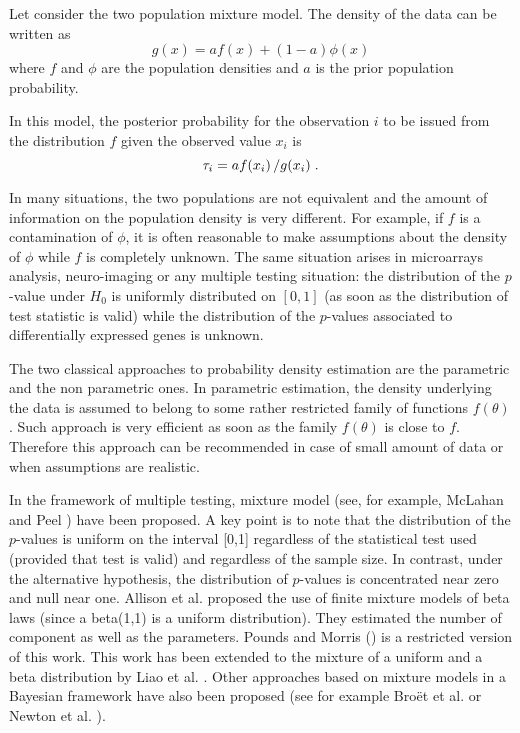 \documentclass[10pt]{article}
\begin{document}
Let consider the two population mixture model. The density of the data can be written as\[g(x)=af(x)+(1-a)\phi(x)\] where $f$ and $\phi$ are the population
densities and $a$ is the prior population probability.

In this model, the posterior probability for the observation $i$ to be issued from the distribution $f$ given the observed value $x_i$ is
\begin{equation} \label{Eq:Tau}
\tau_i = a f(x_i) \left/ g(x_i) \right..
\end{equation}

In many situations, the two populations are not equivalent and the amount of information on the population density is very different. For example, if $f$ is a
contamination of $\phi$, it is often reasonable to make assumptions about the density of $\phi$ while $f$ is completely unknown. The same situation arises in
microarrays analysis, neuro-imaging or any multiple testing situation: the distribution of the $p$-value under $H_0$ is uniformly distributed on $[0,1]$ (as
soon as the distribution of test statistic is valid) while the distribution of the $p$-values associated to differentially expressed genes is unknown.


The two classical approaches to probability density estimation are the parametric and the non parametric ones. In parametric estimation, the density underlying
the data is assumed to belong to some rather restricted family of functions $f(\theta)$. Such approach is very efficient as soon as the family $f(\theta)$ is
close to $f$. Therefore this approach can be recommended in case of small amount of data or when assumptions are realistic.

In the framework of multiple testing, mixture model (see, for example, McLahan and Peel \cite{MaP00} ) have been proposed.
A key point is to note that the distribution of the $p$-values is uniform on the interval [0,1] regardless of the statistical test used (provided that test is
valid) and regardless of the sample size. In contrast, under the alternative hypothesis, the distribution of $p$-values is concentrated near zero and null near
one. Allison et al. \cite{AGH02} proposed the use of finite mixture models of beta laws (since a beta(1,1) is a uniform distribution). They estimated the
number of component as well as the parameters. Pounds and Morris (\cite{POM03}) is a restricted version of this work. This work has been extended to the
mixture of a uniform and a beta distribution by Liao et al. \cite{LLS04}. Other approaches based on mixture models in a Bayesian framework have also been
proposed (see for example Bro\"{e}t et al. \cite{BLR04} or Newton et al. \cite{NNS04}).
\end{document}
